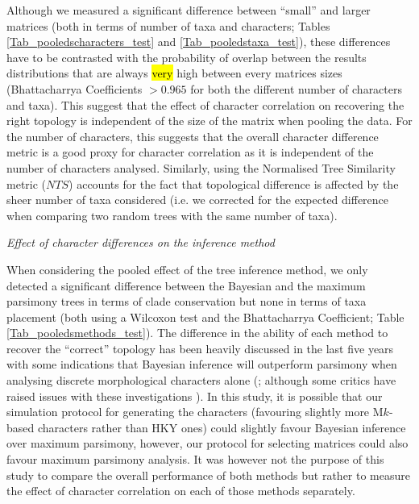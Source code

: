 \documentclass[12pt,letterpaper]{article}
\renewcommand{\subsection}[1]{%
\bigskip
\begin{center}
\begin{large}
\normalfont\itshape #1
\end{large}
\end{center}}
\begin{document}
Although we measured a significant difference between ``small'' and larger matrices (both in terms of number of taxa and characters; Tables \ref{Tab_pooledscharacters_test} and \ref{Tab_pooledstaxa_test}), these differences have to be contrasted with the probability of overlap between the results distributions that are always \hl{very} high between every matrices sizes (Bhattacharrya Coefficients $>0.965$ for both the different number of characters and taxa).
This suggest that the effect of character correlation on recovering the right topology is independent of the size of the matrix when pooling the data.
For the number of characters, this suggests that the overall character difference metric is a good proxy for character correlation as it is independent of the number of characters analysed.
Similarly, using the Normalised Tree Similarity metric ($NTS$) accounts for the fact that topological difference is affected by the sheer number of taxa considered (i.e. we corrected for the expected difference when comparing two random trees with the same number of taxa).

\subsection{Effect of character differences on the inference method}
When considering the pooled effect of the tree inference method, we only detected a significant difference between the Bayesian and the maximum parsimony trees in terms of clade conservation but none in terms of taxa placement (both using a Wilcoxon test and the Bhattacharrya Coefficient; Table \ref{Tab_pooledsmethods_test}).
The difference in the ability of each method to recover the ``correct'' topology has been heavily discussed in the last five years with some indications that Bayesian inference will outperform parsimony when analysing discrete morphological characters alone (\citealt{wrightbayesian2014,OReilly20160081,puttick2017uncertain}; although some critics have raised issues with these investigations \citealt{spencerefficacy2013,goloboff2017weighted}).
In this study, it is possible that our simulation protocol for generating the characters (favouring slightly more M$k$-based characters rather than HKY ones) could slightly favour Bayesian inference over maximum parsimony, however, our protocol for selecting matrices \citep[i.e. those with in a $CI>0.26$ in a quick preliminary parsimony search;][]{OReilly20160081} could also favour maximum parsimony analysis.
It was however not the purpose of this study to compare the overall performance of both methods but rather to measure the effect of character correlation on each of those methods separately.
\end{document}
